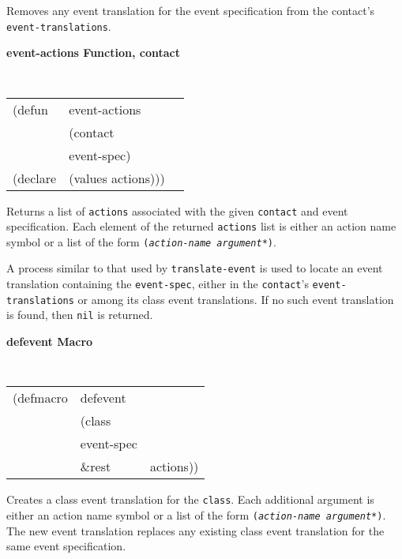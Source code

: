 \begin{flushright} \parbox[t]{6.125in}{
Removes any event translation for the event specification  from the
contact's {\tt event-translations}. 

}\end{flushright}


{\samepage
{\large {\bf event-actions \hfill Function, contact}}
\begin{flushright} \parbox[t]{6.125in}{
\tt
\begin{tabular}{lll}
\raggedright
(defun & event-actions & \\ 
& (contact\\
&  event-spec)\\
(declare & (values actions)))
\end{tabular}
\rm

}\end{flushright}
}

\begin{flushright} \parbox[t]{6.125in}{
Returns a list of {\tt actions} associated with the given {\tt contact} and
event specification. 
Each element of the returned  {\tt actions} list is either an action name symbol
or a list of the form {\tt ({\em action-name argument*})}.  

A process similar to that used by {\tt translate-event} is used to locate an
event translation containing the {\tt event-spec}, either in the {\tt contact}'s
{\tt event-translations} or among its class event translations. If no such event
translation is found, then {\tt nil} is returned.

}\end{flushright}



{\samepage
{\large {\bf defevent \hfill Macro}} 
\begin{flushright} \parbox[t]{6.125in}{
\tt
\begin{tabular}{lll}
\raggedright
(defmacro & defevent \\ 
& (class\\
&  event-spec\\
& \&rest & actions))
\end{tabular}
\rm

}\end{flushright}
}

\begin{flushright} \parbox[t]{6.125in}{
Creates a class event translation for the {\tt class}.
Each additional argument is either an action name symbol or a list of the form
{\tt ({\em action-name argument*})}.
The new event translation replaces
any existing class event translation for the same event specification.

}\end{flushright}

